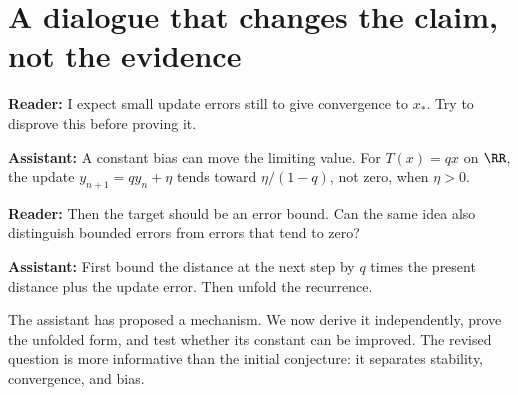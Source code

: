 \section{A dialogue that changes the claim, not the evidence}
\textbf{Reader:} I expect small update errors still to give convergence to $x_*$. Try to disprove this before proving it.

\textbf{Assistant:} A constant bias can move the limiting value. For $T(x)=qx$ on $\RR$, the update $y_{n+1}=qy_n+\eta$ tends toward $\eta/(1-q)$, not zero, when $\eta>0$.

\textbf{Reader:} Then the target should be an error bound. Can the same idea also distinguish bounded errors from errors that tend to zero?

\textbf{Assistant:} First bound the distance at the next step by $q$ times the present distance plus the update error. Then unfold the recurrence.

The assistant has proposed a mechanism. We now derive it independently, prove the unfolded form, and test whether its constant can be improved. The revised question is more informative than the initial conjecture: it separates stability, convergence, and bias.
